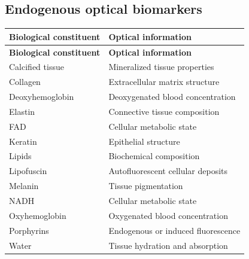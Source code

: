 \subsection{Endogenous optical biomarkers}
\begin{longtable}{@{}p{}p{}@{}}
\toprule
\textbf{Biological constituent} & \textbf{Optical information} \\
\midrule
\endfirsthead
\toprule
\textbf{Biological constituent} & \textbf{Optical information} \\
\midrule
\endhead
Calcified tissue & Mineralized tissue properties \\
Collagen & Extracellular matrix structure \\
Deoxyhemoglobin & Deoxygenated blood concentration \\
Elastin & Connective tissue composition \\
FAD & Cellular metabolic state \\
Keratin & Epithelial structure \\
Lipids & Biochemical composition \\
Lipofuscin & Autofluorescent cellular deposits \\
Melanin & Tissue pigmentation \\
NADH & Cellular metabolic state \\
Oxyhemoglobin & Oxygenated blood concentration \\
Porphyrins & Endogenous or induced fluorescence \\
Water & Tissue hydration and absorption \\
\bottomrule
\end{longtable}

